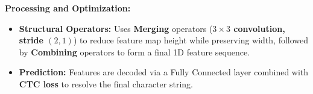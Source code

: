 \textbf{Processing and Optimization:}
\begin{itemize}
    \item \textbf{Structural Operators:} Uses \textbf{Merging} operators (\textbf{$3 \times 3$ convolution, stride $(2, 1)$}) to reduce feature map height while preserving width, followed by \textbf{Combining} operators to form a final 1D feature sequence.
    \item \textbf{Prediction:} Features are decoded via a Fully Connected layer combined with \textbf{CTC loss} to resolve the final character string.
\end{itemize}

